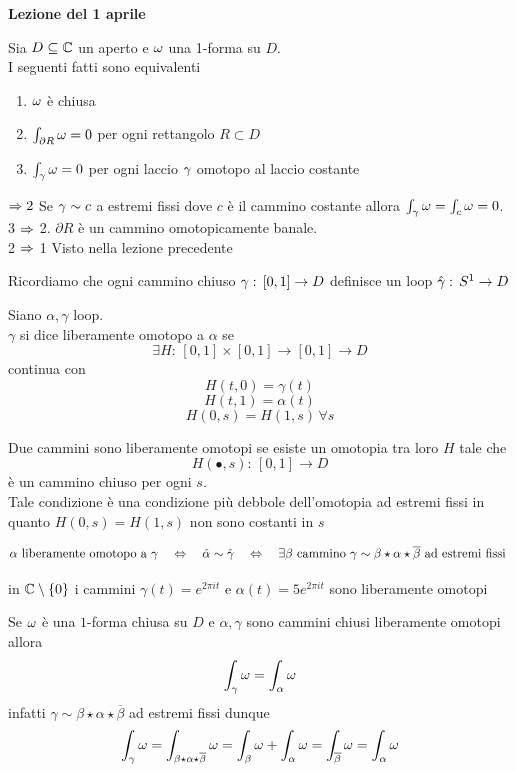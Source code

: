 

\textbf{Lezione del 1 aprile}
\begin{thm}Sia $D\subseteq \mathbb{C}$ un aperto e $\omega$ una 1-forma su $D$.\\
I seguenti fatti sono equivalenti
\begin{enumerate}
\item $\omega$ \`e chiusa
\item $\int_{\partial R} \omega=0$ per ogni rettangolo $R\subset D$
\item $\int_\gamma \omega =0$ per ogni laccio $\gamma$ omotopo al laccio costante
\end{enumerate}
 $\Rightarrow 2$ Se $\gamma\sim c$ a estremi fissi dove $c$ \`e il cammino costante allora
$\int_\gamma \omega =\int_c\omega =0$.\\
3 $\Rightarrow $ 2. $\partial R$ \`e un cammino omotopicamente banale.\\
2 $\Rightarrow$ 1 Visto nella lezione precedente
\end{thm}

Ricordiamo che ogni cammino chiuso $\gamma:\, [0,1]\to D$ definisce un loop $\hat{\gamma}:\, S^1 \to D$
\begin{defn}\bianco
Siano $\alpha, \gamma$ loop.\\
$\gamma$ si dice liberamente omotopo a $\alpha$ se
$$\exists H:\, [0,1]\times [0,1]\to [0,1] \to D$$ 
continua con 
$$H(t,0)=\gamma(t) $$
$$H(t,1)=\alpha(t)$$
$$H(0,s)=H(1,s) \, \forall s $$
\end{defn}
\begin{oss}Due cammini sono liberamente omotopi se esiste un omotopia tra loro $H$ tale che 
$$H(\bullet, s):\, [0,1]\to D$$ 
\`e un cammino chiuso per ogni $s$.\\
Tale condizione \`e una condizione pi\`u debbole dell'omotopia ad estremi fissi in quanto $H(0,s) = H(1,s)$ non sono costanti in $s$
\end{oss}

\begin{prop}
$$ \alpha \text{ liberamente omotopo a } \gamma \quad \Leftrightarrow \quad \hat{\alpha}\sim \hat{\gamma} \quad \Leftrightarrow\quad \exists\beta \text{ cammino } \gamma \sim \beta \star \alpha \star \overline{\beta} \text{ ad estremi fissi } $$
\end{prop}
\begin{ese}in $\mathbb{C}\setminus\left\{ 0 \right\} $ i cammini $\gamma(t) =e^{2\pi i t} $ e $\alpha(t) = 5e^{2\pi it}$ sono liberamente omotopi 
\end{ese}
\begin{fatto}Se $\omega$ \`e una $1$-forma chiusa su $D$ e $\alpha, \gamma$ sono cammini chiusi liberamente omotopi allora
$$ \int_\gamma \omega = \int_\alpha \omega$$
infatti $\gamma \sim \beta \star \alpha\star \overline{\beta}$ ad estremi fissi dunque 
$$ \int_\gamma \omega = \int_{\beta \star \alpha\star \overline{\beta}} \omega = \int_\beta \omega +\int_\alpha \omega = \int_{\overline{\beta}} \omega = \int_\alpha\omega$$
\end{fatto}
\newpage
